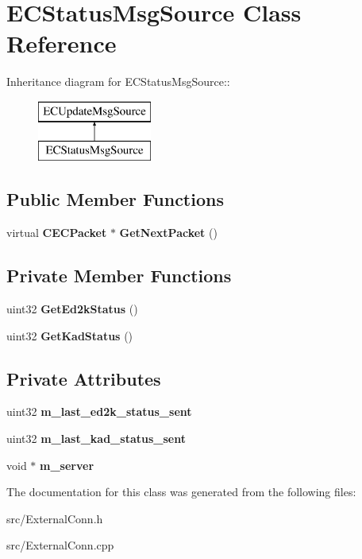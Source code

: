 \section{ECStatusMsgSource Class Reference}
\label{classECStatusMsgSource}
Inheritance diagram for ECStatusMsgSource::\begin{figure}[H]
\begin{center}
\leavevmode
\includegraphics[height=2cm]{classECStatusMsgSource}
\end{center}
\end{figure}
\subsection*{Public Member Functions}
\begin{DoxyCompactItemize}
\item 
virtual {\bf CECPacket} $\ast$ {\bfseries GetNextPacket} ()\label{classECStatusMsgSource_a9538133dbd4fc1aac1cf8c9fec503bfd}

\end{DoxyCompactItemize}
\subsection*{Private Member Functions}
\begin{DoxyCompactItemize}
\item 
uint32 {\bfseries GetEd2kStatus} ()\label{classECStatusMsgSource_a2df9e629a190108d4d0ff02dad35ac1f}

\item 
uint32 {\bfseries GetKadStatus} ()\label{classECStatusMsgSource_a62977693a44d896a2b610136e752e0a8}

\end{DoxyCompactItemize}
\subsection*{Private Attributes}
\begin{DoxyCompactItemize}
\item 
uint32 {\bfseries m\_\-last\_\-ed2k\_\-status\_\-sent}\label{classECStatusMsgSource_a9c07810a1bcce85fc4c1e8081a05fc5d}

\item 
uint32 {\bfseries m\_\-last\_\-kad\_\-status\_\-sent}\label{classECStatusMsgSource_aa59724036ec558e90d5a0bcd89829f63}

\item 
void $\ast$ {\bfseries m\_\-server}\label{classECStatusMsgSource_a67d6a80764784f96f158e5c04014b436}

\end{DoxyCompactItemize}


The documentation for this class was generated from the following files:\begin{DoxyCompactItemize}
\item 
src/ExternalConn.h\item 
src/ExternalConn.cpp\end{DoxyCompactItemize}
